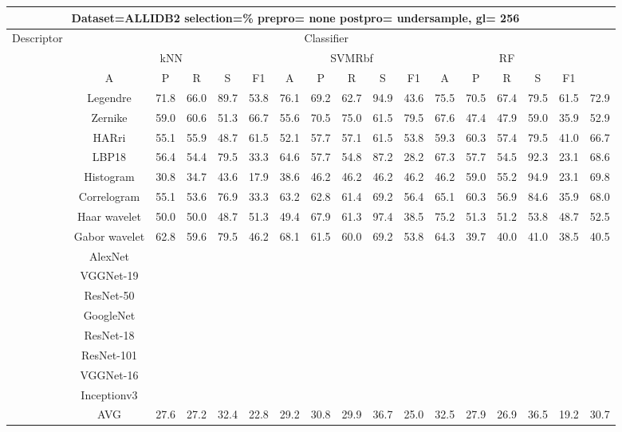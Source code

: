 \documentclass[12pt,italian]{article}
\begin{document}
\begin{tiny}
\begin{longtable}{lcccccccccccccccc}
\toprule
\multicolumn{16}{c}{Dataset=ALLIDB2 selection=\% prepro= none postpro= undersample, gl= 256} \\ 
\toprule
Descriptor & \multicolumn{15}{c}{Classifier} \\ 
& \multicolumn{5}{c}{kNN} & \multicolumn{5}{c}{SVMRbf} & \multicolumn{5}{c}{RF} \\ 
& A & P & R & S & F1 & A & P & R & S & F1 & A & P & R & S & F1 \\ 
\midrule
& Legendre & 71.8 & 66.0 & 89.7 & 53.8 & 76.1 & 69.2 & 62.7 & 94.9 & 43.6 & 75.5 & 70.5 & 67.4 & 79.5 & 61.5 & 72.9 \\ 
& Zernike & 59.0 & 60.6 & 51.3 & 66.7 & 55.6 & 70.5 & 75.0 & 61.5 & 79.5 & 67.6 & 47.4 & 47.9 & 59.0 & 35.9 & 52.9 \\ 
& HARri & 55.1 & 55.9 & 48.7 & 61.5 & 52.1 & 57.7 & 57.1 & 61.5 & 53.8 & 59.3 & 60.3 & 57.4 & 79.5 & 41.0 & 66.7 \\ 
& LBP18 & 56.4 & 54.4 & 79.5 & 33.3 & 64.6 & 57.7 & 54.8 & 87.2 & 28.2 & 67.3 & 57.7 & 54.5 & 92.3 & 23.1 & 68.6 \\ 
& Histogram & 30.8 & 34.7 & 43.6 & 17.9 & 38.6 & 46.2 & 46.2 & 46.2 & 46.2 & 46.2 & 59.0 & 55.2 & 94.9 & 23.1 & 69.8 \\ 
& Correlogram & 55.1 & 53.6 & 76.9 & 33.3 & 63.2 & 62.8 & 61.4 & 69.2 & 56.4 & 65.1 & 60.3 & 56.9 & 84.6 & 35.9 & 68.0 \\ 
& Haar wavelet & 50.0 & 50.0 & 48.7 & 51.3 & 49.4 & 67.9 & 61.3 & 97.4 & 38.5 & 75.2 & 51.3 & 51.2 & 53.8 & 48.7 & 52.5 \\ 
& Gabor wavelet & 62.8 & 59.6 & 79.5 & 46.2 & 68.1 & 61.5 & 60.0 & 69.2 & 53.8 & 64.3 & 39.7 & 40.0 & 41.0 & 38.5 & 40.5 \\ 
& AlexNet \\ 
& VGGNet-19 \\ 
& ResNet-50 \\ 
& GoogleNet \\ 
& ResNet-18 \\ 
& ResNet-101 \\ 
& VGGNet-16 \\ 
& Inceptionv3 \\ 
\hline
& AVG & 27.6 & 27.2 & 32.4 & 22.8 & 29.2 & 30.8 & 29.9 & 36.7 & 25.0 & 32.5 & 27.9 & 26.9 & 36.5 & 19.2 & 30.7 \\ 
\hline
\bottomrule
\end{longtable} 


\end{tiny}
\end{document}
